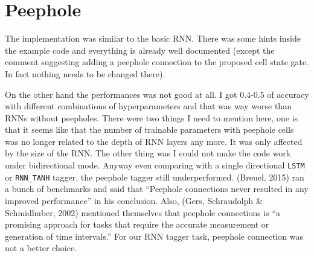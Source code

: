 \documentclass[11pt]{article} %
\begin{document}
\section{Peephole}

The implementation was similar to the basic RNN. There was some hints inside the example code and everything is already well documented (except the comment suggesting adding a peephole connection to the proposed cell state gate. In fact nothing needs to be changed there).

On the other hand the performances was not good at all. I got $0.4$-$0.5$ of accuracy with different combinations of hyperparameters and that was way worse than RNNs without peepholes. There were two things I need to mention here, one is that it seems like that the number of trainable parameters with peephole cells was no longer related to the depth of RNN layers any more. It was only affected by the size of the RNN. The other thing was I could not make the code work under bidirectional mode. Anyway even comparing with a single directional \verb|LSTM| or \verb|RNN_TANH| tagger, the peephole tagger still underperformed. (Breuel, 2015) ran a bunch of benchmarks and said that ``Peephole connections never resulted in any improved performance'' in his conclusion.\cite{breuel2015benchmarking} Also, (Gers, Schraudolph \& Schmidhuber, 2002) mentioned themselves that peephole connections is ``a promising approach for tasks that require the accurate measurement or generation of time intervals.''\cite{gers2002learning} For our RNN tagger task, peephole connection was not a better choice.

\printbibliography
\end{document}
